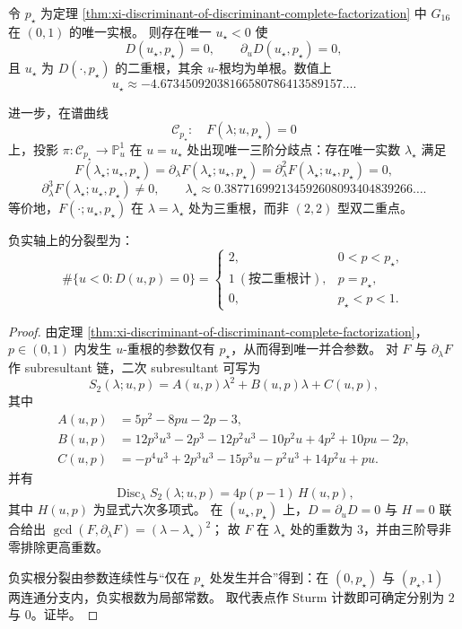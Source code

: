 \begin{theorem}[唯一三阶分歧点与三重谱碰撞]\label{thm:xi-unique-cubic-branchpoint-triple-collision}
令 \(p_\star\) 为定理 \ref{thm:xi-discriminant-of-discriminant-complete-factorization} 中
\(G_{16}\) 在 \((0,1)\) 的唯一实根。
则存在唯一 \(u_\star<0\) 使
\[
D(u_\star,p_\star)=0,
\qquad
\partial_u D(u_\star,p_\star)=0,
\]
且 \(u_\star\) 为 \(D(\cdot,p_\star)\) 的二重根，其余 \(u\)-根均为单根。数值上
\[
u_\star\approx-4.67345092038166580786413589157\ldots.
\]

进一步，在谱曲线
\[
\mathcal C_{p_\star}:\quad F(\lambda;u,p_\star)=0
\]
上，投影
\(
\pi:\mathcal C_{p_\star}\to\mathbb P_u^1
\)
在 \(u=u_\star\) 处出现唯一三阶分歧点：存在唯一实数 \(\lambda_\star\) 满足
\[
F(\lambda_\star;u_\star,p_\star)
=\partial_\lambda F(\lambda_\star;u_\star,p_\star)
=\partial_\lambda^2F(\lambda_\star;u_\star,p_\star)=0,
\]
\[
\partial_\lambda^3F(\lambda_\star;u_\star,p_\star)\neq0,
\qquad
\lambda_\star\approx0.387716992134592608093404839266\ldots.
\]
等价地，\(F(\cdot;u_\star,p_\star)\) 在 \(\lambda=\lambda_\star\) 处为三重根，而非 \((2,2)\) 型双二重点。

负实轴上的分裂型为：
\[
\#\{u<0:D(u,p)=0\}
=
\begin{cases}
2, & 0<p<p_\star,\\
1\ (\text{按二重根计}), & p=p_\star,\\
0, & p_\star<p<1.
\end{cases}
\]
\end{theorem}
\begin{proof}
由定理 \ref{thm:xi-discriminant-of-discriminant-complete-factorization}，\(p\in(0,1)\) 内发生 \(u\)-重根的参数仅有 \(p_\star\)，从而得到唯一并合参数。
对 \(F\) 与 \(\partial_\lambda F\) 作 subresultant 链，二次 subresultant 可写为
\[
S_2(\lambda;u,p)=A(u,p)\lambda^2+B(u,p)\lambda+C(u,p),
\]
其中
\[
\begin{aligned}
A(u,p)&=5p^{2}-8pu-2p-3,\\
B(u,p)&=12p^{3}u^{3}-2p^{3}-12p^{2}u^{3}-10p^{2}u+4p^{2}+10pu-2p,\\
C(u,p)&=-p^{4}u^{3}+2p^{3}u^{3}-15p^{3}u-p^{2}u^{3}+14p^{2}u+pu.
\end{aligned}
\]
并有
\[
\operatorname{Disc}_{\lambda}S_2(\lambda;u,p)=4p(p-1)\,H(u,p),
\]
其中 \(H(u,p)\) 为显式六次多项式。
在 \((u_\star,p_\star)\) 上，\(D=\partial_uD=0\) 与 \(H=0\) 联合给出
\(
\gcd(F,\partial_\lambda F)=(\lambda-\lambda_\star)^2
\)；
故 \(F\) 在 \(\lambda_\star\) 处的重数为 \(3\)，并由三阶导非零排除更高重数。

负实根分裂由参数连续性与“仅在 \(p_\star\) 处发生并合”得到：在
\((0,p_\star)\) 与 \((p_\star,1)\) 两连通分支内，负实根数为局部常数。
取代表点作 Sturm 计数即可确定分别为 \(2\) 与 \(0\)。证毕。
\end{proof}


